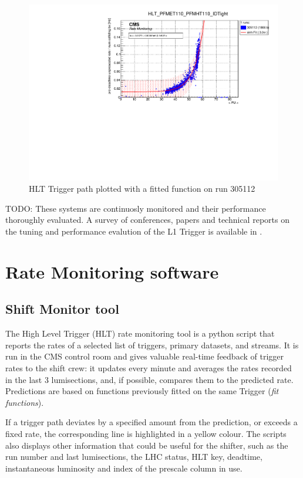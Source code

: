 \begin{figure}
    \centerline{
        \includegraphics[width=0.6\paperwidth]{figures/RMT_305112_HLT_PFMET110_PFMHT110_IDTight.pdf}}
    \caption{HLT Trigger path plotted with a fitted function on run 305112}
    \label{fig:ratemon_hlt}
\end{figure}

TODO:
These systems are continuosly monitored and their performance thoroughly evaluated. A survey of conferences, papers and technical reports on the tuning and performance evalution of the L1 Trigger is available in \cite{L1TriggerDPGResultsCMSPublicTWiki-2020-10-16}.

\section{Rate Monitoring software}

\subsection{Shift Monitor tool}

The High Level Trigger (HLT) rate monitoring tool is a python script that reports the rates of a selected list of triggers, primary datasets, and streams. It is run in the CMS control room and gives valuable real-time feedback of trigger rates to the shift crew: it updates every minute and averages the rates recorded in the last 3 lumisections, and, if possible, compares them to the predicted rate. Predictions are based on functions previously fitted on the same Trigger (\textit{fit functions}).

If a trigger path deviates by a specified amount from the prediction, or exceeds a fixed rate, the corresponding line is highlighted in a yellow colour. The scripts also displays other information that could be useful for the shifter, such as the run number and last lumisections, the LHC status, HLT key, deadtime, instantaneous luminosity and index of the prescale column in use.

